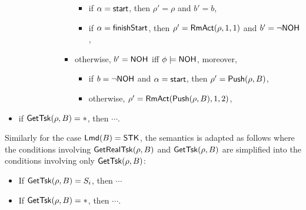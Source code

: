 \begin{itemize}
\begin{itemize}
\begin{itemize}
\begin{itemize}
\begin{itemize}
					\begin{itemize}
						\item if $\alpha = {\mathsf{start} }$, then $\rho' = \rho$ and $b' = b$, 
						\item if $\alpha = {\mathsf{finishStart} }$, then $\rho' = \mathsf{RmAct}(\rho, 1, 1)$ and $b' = \neg{\sf NOH}$, 
					\end{itemize}
                    \item otherwise, $b' = {\sf NOH}$ iff $\phi \models {\sf NOH}$, moreover, 
                    \begin{itemize}
                        \item if $b = \neg {\sf NOH}$ and $\alpha = {\mathsf{start} }$, then $\rho'=\mathsf{Push}(\rho, B)$,
                        \item otherwise, $\rho' = \mathsf{RmAct}(\mathsf{Push}(\rho, B), 1, 2)$, 
                    \end{itemize}
            \end{itemize}
        \end{itemize}
    \end{itemize}
\end{itemize}
\item if $\mathsf{GetTsk}(\rho, B) = *$, then $\cdots$. 
\end{itemize}

Similarly for the case ${\sf Lmd}(B) = {\sf STK}$, the semantics is adapted as follows where the conditions involving $\mathsf{GetRealTsk}(\rho, B)$ and $\mathsf{GetTsk}(\rho, B)$ are simplified into the conditions involving only $\mathsf{GetTsk}(\rho, B)$:
\begin{itemize}
	\item If $\mathsf{GetTsk}(\rho, B) = S_i$, then $\cdots$
	\item If $\mathsf{GetTsk}(\rho,B) = *$, then $\cdots$.
\end{itemize}

